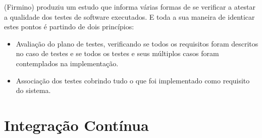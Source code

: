 (Firmino) produziu um estudo que informa várias formas de se verificar a atestar
a qualidade dos testes de software executados. E toda a sua maneira de identicar
estes pontos é partindo de dois princípios:

\begin{itemize}
\item Avaliação do plano de testes, verificando se todos os requisitos foram
descritos no caso de testes e se todos os testes e seus múltiplos casos foram
contemplados na implementação.
\item Associação dos testes cobrindo tudo o que foi implementado como requisito
do sistema.
\end{itemize}
\section{Integração Contínua}

